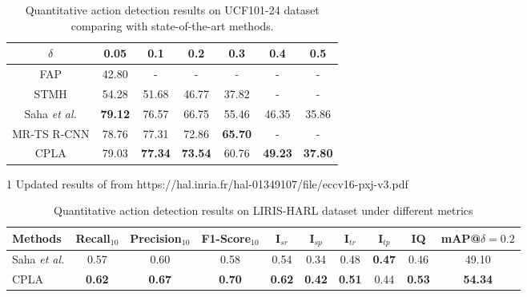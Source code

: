 \documentclass{bmvc2k}
\begin{document}
\begin{table}[!htbp]
\centering
\caption{Quantitative action detection results on UCF101-24 dataset comparing with state-of-the-art methods.}
\label{comp_sota}
\begin{threeparttable}
\begin{tabular}{l|c|c|c|c|c|c}
\hline
\multicolumn{1}{c|}{$\delta$}    & 0.05  & 0.1   & 0.2   & 0.3   & 0.4   & 0.5   \\ \hline
\multicolumn{1}{c|}{FAP\cite{yu2015fast}}         & 42.80 & -     & -     & -     & -     & -     \\
\multicolumn{1}{c|}{STMH\cite{weinzaepfel2015learning}}        & 54.28 & 51.68 & 46.77 & 37.82 & -     & -     \\
\multicolumn{1}{c|}{Saha \textit{et al.} \cite{suman16bmvc}} & \textbf{79.12} & 76.57 & 66.75 & 55.46 & 46.35 & 35.86 \\
\multicolumn{1}{c|}{MR-TS R-CNN \cite{peng2016multi}\footnotemark} & 78.76 & 77.31 & 72.86 & \textbf{65.70} & -     & -     \\
\multicolumn{1}{c|}{CPLA}   & 79.03 & \textbf{77.34} & \textbf{73.54} & 60.76 & \textbf{49.23} & \textbf{37.80} \\ \hline
\end{tabular} 
\begin{tablenotes}\footnotesize
\item[1] Updated results of \cite{peng2016multi} from https://hal.inria.fr/hal-01349107/file/eccv16-pxj-v3.pdf
\end{tablenotes}
\end{threeparttable}
\end{table}


\begin{table}[!htbp]
\centering
\caption{Quantitative action detection results on LIRIS-HARL dataset under different metrics}
\label{liris-comp}
\fontsize{7.5}{8.5}\selectfont
\begin{tabular}{l|ccccccccc}
\hline
Methods         & Recall$_{10}$    & Precision$_{10}$ & F1-Score$_{10}$  & I$_{sr}$         & I$_{sp}$         & I$_{tr}$         & I$_{tp}$         & IQ            & mAP@$\delta=0.2$  \\ \hline
Saha \textit{et al.} \cite{suman16bmvc}     & 0.57 & 0.60          & 0.58          & 0.54          & 0.34          & 0.48          & \textbf{0.47} & 0.46          & 49.10          \\
CPLA       & \textbf{0.62}          & \textbf{0.67} & \textbf{0.70} & \textbf{0.62} & \textbf{0.42} & \textbf{0.51} & 0.44          & \textbf{0.53} & \textbf{54.34} \\ \hline
\end{tabular}
\end{table}
\end{document}
